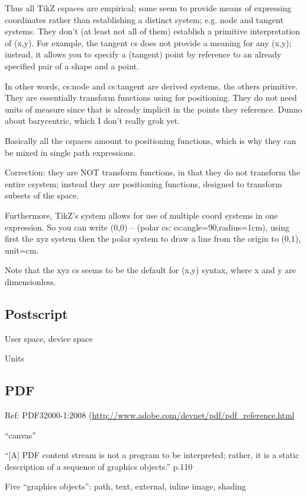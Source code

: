 \documentclass{tufte-handout}
\numberwithin{equation}{subsection}
\begin{document}
Thus all TikZ cspaces are empirical; some seem to provide means of
expressing coordinates rather than establishing a distinct system;
e.g. node and tangent systems.  They don't (at least not all of them)
establish a primitive interpretation of (x,y).  For example, the
tangent cs does not provide a meaning for any (x,y); instead, it
allows you to specify a (tangent) point by reference to an already
specified pair of a shape and a point.

In other words, cs:node and cs:tangent are derived systems, the others
primitive.  They are essentially transform functions using for
positioning.  They do not need units of measure since that is already
implicit in the points they reference.  Dunno about barycentric, which
I don't really grok yet.

Basically all the cspaces amount to positioning functions, which is
why they can be mixed in single path expressions.

Correction: they are NOT transform functions, in that they do not
transform the entire csystem; instead they are positioning functions,
designed to transform subsets of the space.

Furthermore, TikZ's system allows for use of multiple coord systems in
one expression.  So you can write (0,0) -- (polar cs:
cs:angle=90,radius=1cm), using first the xyz system then the polar
system to draw a line from the origin to (0,1), unit=cm.

Note that the xyz cs seems to be the default for (x,y) syntax, where x
and y are dimensionless.

\subsection{Postscript}

User space, device space

Units

\subsection{PDF}

Ref:  PDF32000-1:2008 (\url{http://www.adobe.com/devnet/pdf/pdf\_reference.html}

``canvas''

``[A] PDF content stream is not a program to be interpreted; rather, it is a static description of a sequence of graphics objects.'' p.110

Five ``graphics objects'': path, text, external, inline image, shading
\end{document}
